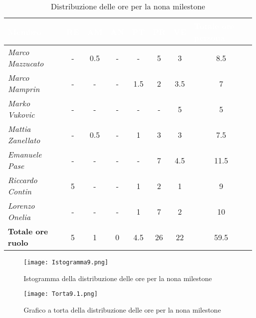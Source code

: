 \begin{table}[H]
    \renewcommand\arraystretch{1.5}
    \centering
    \begin{tabular}{|l|c|c|c|c|c|c|c|}
    \hline
    \rowcolor[HTML]{036400}
    \textcolor{white}{\textbf{Membro}} & \multicolumn{1}{l|}{\textcolor{white}{\textbf{RE}}} & \multicolumn{1}{l|}{\textcolor{white}{\textbf{AM}}} & \multicolumn{1}{l|}{\textcolor{white}{\textbf{AN}}} & \multicolumn{1}{l|}{\textcolor{white}{\textbf{PT}}} & \multicolumn{1}{l|}{\textcolor{white}{\textbf{PR}}} & \multicolumn{1}{l|}{\textcolor{white}{\textbf{VE}}} & \multicolumn{1}{l|}{\textcolor{white}{\textbf{Totale ore persona}}} \\ \hline
    \rowcolor[HTML]{EFEFEF}\textit{Marco Mazzucato}  & - & 0.5 & -  & -    & 5   & 3    & 8.5     \\ \hline
    \rowcolor[HTML]{C0C0C0}\textit{Marco Mamprin}    & - & -   & -  & 1.5  & 2   & 3.5  & 7     \\ \hline
    \rowcolor[HTML]{EFEFEF}\textit{Marko Vukovic}    & - & -   & -  & -    & -   & 5    & 5     \\ \hline
    \rowcolor[HTML]{C0C0C0}\textit{Mattia Zanellato} & - & 0.5 & -  & 1    & 3   & 3    & 7.5     \\ \hline
    \rowcolor[HTML]{EFEFEF}\textit{Emanuele Pase}    & - & -   & -  & -    & 7   & 4.5  & 11.5     \\ \hline
    \rowcolor[HTML]{C0C0C0}\textit{Riccardo Contin}  & 5 & -   & -  & 1    & 2   & 1    & 9     \\ \hline
    \rowcolor[HTML]{EFEFEF}\textit{Lorenzo Onelia}   & - & -   & -  & 1    & 7   & 2    & 10    \\ \hline
    \rowcolor[HTML]{C0C0C0}\textbf{Totale ore ruolo} & 5 & 1   & 0  & 4.5  & 26  & 22   & 59.5    \\ \hline
    \end{tabular}
    \caption{Distribuzione delle ore per la nona milestone}
\end{table}

\begin{figure}[H]
    \texttt{[image: Istogramma9.png]}
    \caption{Istogramma della distribuzione delle ore per la nona milestone}
\end{figure}

\begin{figure}[H]
    \texttt{[image: Torta9.1.png]}
    \caption{Grafico a torta della distribuzione delle ore per la nona milestone}
\end{figure}

